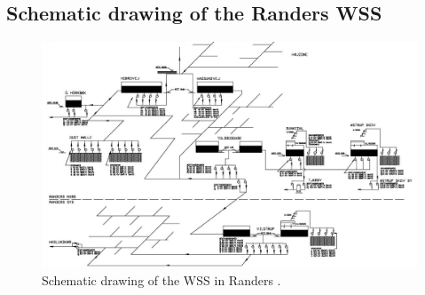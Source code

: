 \begin{landscape}

\chapter{Schematic drawing of the Randers WSS}
\label{schematic_WSS}

\thispagestyle{empty}
\vspace{-7mm}
\begin{figure}[H]
\centering
\includegraphics[width=1.27\textwidth]{report/pictures/cad_drawing_1}
\vspace{-3mm}
\caption{Schematic drawing of the WSS in Randers \cite{verdo}.}
\label{fig:schematic_CAD}
\end{figure}

 \vfill
 \raisebox{0pt}{\makebox[\linewidth]{\thepage}}
\end{landscape}